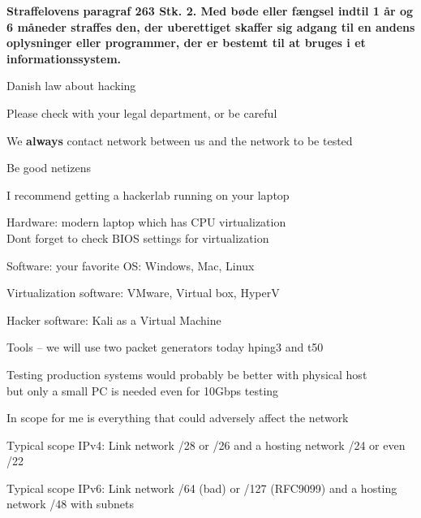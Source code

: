 \documentclass[Screen16to9,17pt]{foils}
\begin{document}

{\bfseries Straffelovens paragraf 263 Stk. 2. Med bøde eller fængsel indtil 1 år og 6 måneder straffes den, der uberettiget skaffer sig adgang til en andens oplysninger eller programmer, der er bestemt til at bruges i et informationssystem. }

\begin{list2}
\item Danish law about hacking
\item Please check with your legal department, or be careful
\item We {\bf always} contact network between us and the network to be tested
\item Be good netizens
\end{list2}




\begin{list2}
\item I recommend getting a hackerlab running on your laptop
\item Hardware: modern laptop which has CPU virtualization\\
Dont forget to check BIOS settings for virtualization
\item Software: your favorite OS: Windows, Mac, Linux
\item Virtualization software: VMware, Virtual box, HyperV
\item Hacker software: Kali as a Virtual Machine 
\item Tools -- we will use two packet generators today hping3 and t50
\item Testing production systems would probably be better with physical host\\
but only a small PC is needed even for 10Gbps testing
\end{list2}






\begin{list2}
\item In scope for me is everything that could adversely affect the network
\item Typical scope IPv4: Link network /28 or /26 and a hosting network /24 or even /22
\item Typical scope IPv6: Link network /64 (bad) or /127 (RFC9099) and a hosting network /48 with subnets
\end{list2}
\end{document}
